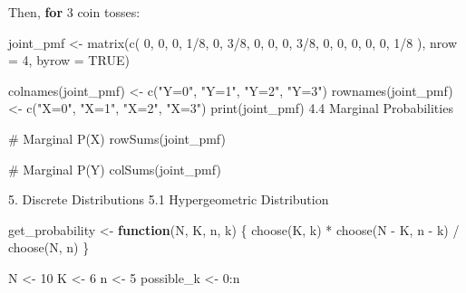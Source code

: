 \documentclass[
  letterpaper,
  DIV=11,
  numbers=noendperiod]{scrreprt}
\newenvironment{Shaded}{\begin{snugshade}}{\end{snugshade}}
\newcommand{\AttributeTok}[1]{\textcolor[rgb]{0.40,0.45,0.13}{#1}}
\newcommand{\CommentTok}[1]{\textcolor[rgb]{0.37,0.37,0.37}{#1}}
\newcommand{\ConstantTok}[1]{\textcolor[rgb]{0.56,0.35,0.01}{#1}}
\newcommand{\ControlFlowTok}[1]{\textcolor[rgb]{0.00,0.23,0.31}{\textbf{#1}}}
\newcommand{\DecValTok}[1]{\textcolor[rgb]{0.68,0.00,0.00}{#1}}
\newcommand{\FloatTok}[1]{\textcolor[rgb]{0.68,0.00,0.00}{#1}}
\newcommand{\FunctionTok}[1]{\textcolor[rgb]{0.28,0.35,0.67}{#1}}
\newcommand{\NormalTok}[1]{\textcolor[rgb]{0.00,0.23,0.31}{#1}}
\newcommand{\OtherTok}[1]{\textcolor[rgb]{0.00,0.23,0.31}{#1}}
\newcommand{\SpecialCharTok}[1]{\textcolor[rgb]{0.37,0.37,0.37}{#1}}
\newcommand{\StringTok}[1]{\textcolor[rgb]{0.13,0.47,0.30}{#1}}
\begin{document}
{\begin{Shaded}
\begin{Highlighting}[]
\NormalTok{Then, }\ControlFlowTok{for} \DecValTok{3}\NormalTok{ coin tosses}\SpecialCharTok{:}

\NormalTok{joint\_pmf }\OtherTok{\textless{}{-}} \FunctionTok{matrix}\NormalTok{(}\FunctionTok{c}\NormalTok{(}
  \DecValTok{0}\NormalTok{,     }\DecValTok{0}\NormalTok{,     }\DecValTok{0}\NormalTok{,  }\DecValTok{1}\SpecialCharTok{/}\DecValTok{8}\NormalTok{,}
  \DecValTok{0}\NormalTok{,  }\DecValTok{3}\SpecialCharTok{/}\DecValTok{8}\NormalTok{,     }\DecValTok{0}\NormalTok{,    }\DecValTok{0}\NormalTok{,}
  \DecValTok{0}\NormalTok{,  }\DecValTok{3}\SpecialCharTok{/}\DecValTok{8}\NormalTok{,     }\DecValTok{0}\NormalTok{,    }\DecValTok{0}\NormalTok{,}
  \DecValTok{0}\NormalTok{,     }\DecValTok{0}\NormalTok{,     }\DecValTok{0}\NormalTok{,  }\DecValTok{1}\SpecialCharTok{/}\DecValTok{8}
\NormalTok{), }\AttributeTok{nrow =} \DecValTok{4}\NormalTok{, }\AttributeTok{byrow =} \ConstantTok{TRUE}\NormalTok{)}

\FunctionTok{colnames}\NormalTok{(joint\_pmf) }\OtherTok{\textless{}{-}} \FunctionTok{c}\NormalTok{(}\StringTok{"Y=0"}\NormalTok{, }\StringTok{"Y=1"}\NormalTok{, }\StringTok{"Y=2"}\NormalTok{, }\StringTok{"Y=3"}\NormalTok{)}
\FunctionTok{rownames}\NormalTok{(joint\_pmf) }\OtherTok{\textless{}{-}} \FunctionTok{c}\NormalTok{(}\StringTok{"X=0"}\NormalTok{, }\StringTok{"X=1"}\NormalTok{, }\StringTok{"X=2"}\NormalTok{, }\StringTok{"X=3"}\NormalTok{)}
\FunctionTok{print}\NormalTok{(joint\_pmf)}
\FloatTok{4.4}\NormalTok{ Marginal Probabilities}

\CommentTok{\# Marginal P(X)}
\FunctionTok{rowSums}\NormalTok{(joint\_pmf)}

\CommentTok{\# Marginal P(Y)}
\FunctionTok{colSums}\NormalTok{(joint\_pmf)}

\FloatTok{5.}\NormalTok{ Discrete Distributions}
\FloatTok{5.1}\NormalTok{ Hypergeometric Distribution}

\NormalTok{get\_probability }\OtherTok{\textless{}{-}} \ControlFlowTok{function}\NormalTok{(N, K, n, k) \{}
  \FunctionTok{choose}\NormalTok{(K, k) }\SpecialCharTok{*} \FunctionTok{choose}\NormalTok{(N }\SpecialCharTok{{-}}\NormalTok{ K, n }\SpecialCharTok{{-}}\NormalTok{ k) }\SpecialCharTok{/} \FunctionTok{choose}\NormalTok{(N, n)}
\NormalTok{\}}

\NormalTok{N }\OtherTok{\textless{}{-}} \DecValTok{10}
\NormalTok{K }\OtherTok{\textless{}{-}} \DecValTok{6}
\NormalTok{n }\OtherTok{\textless{}{-}} \DecValTok{5}
\NormalTok{possible\_k }\OtherTok{\textless{}{-}} \DecValTok{0}\SpecialCharTok{:}\NormalTok{n}


\end{Highlighting}
\end{Shaded}}
\end{document}
